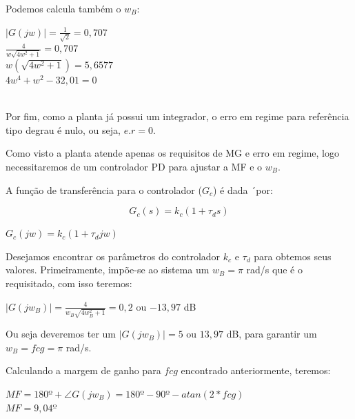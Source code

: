 Podemos calcula também o $w_B$:

\begin{center}
    $|G(jw)| = \frac{1}{\sqrt{2}} =0,707$
    \vspace{5pt}\\
    $\frac{4}{w \sqrt{4w^2+1}}=0,707$\vspace{5pt}\\
    $w(\sqrt{4w^2+1})=5,6577$\vspace{5pt}\\
    $4w^4 +w^2 -32,01 =0$\vspace{5pt}\\
     \vspace{5pt}\\
\end{center}

Por fim, como a planta já possui um integrador, o erro em regime para referência tipo degrau é nulo, ou seja, $e.r=0$. 

Como visto a planta atende apenas os requisitos de MG e erro em regime, logo necessitaremos de um controlador PD para ajustar a MF e o $w_B$.

A função de transferência  para o controlador ($G_c$) é dada ´por:

\begin{equation}\label{Gc}
    G_c(s) = k_c(1+\tau_d s)
\end{equation}

\begin{center}
    $G_c(jw) = k_c(1+\tau_d jw)$
\end{center}

Desejamos encontrar os parâmetros do controlador $k_c$ e $\tau_d$ para obtemos seus valores. Primeiramente, impõe-se ao sistema um $w_B = \pi$ rad/s que é o requisitado, com isso teremos:

\begin{center}
    $|G(jw_B)| = \frac{4}{w_B\sqrt{4w_B^2 +1}} = 0,2$  ou $-13,97$ dB \vspace{4pt}\\
\end{center}

Ou seja deveremos ter um $|G(jw_B)| = 5$ ou $13, 97$ dB, para garantir um $w_B = fcg = \pi$ rad/s.

Calculando a margem de ganho para $fcg$ encontrado anteriormente, teremos:

\begin{center}
    $MF = 180º + \angle G(jw_B) = 180º - 90º - atan(2*fcg)$ \vspace{4pt}\\
    $MF = 9,04º$
\end{center}


